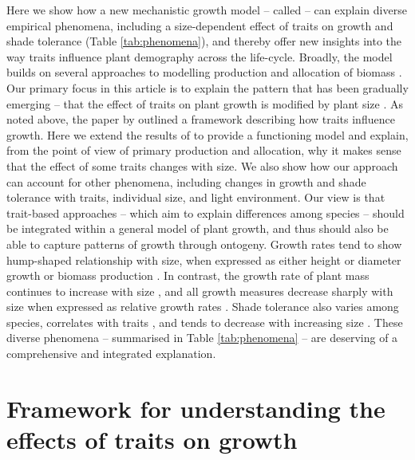 \documentclass[a4paper,11pt]{article}
\begin{document}
Here we show how a new mechanistic growth model -- called {\plant} \citep{Falster-2016} -- can explain diverse empirical phenomena, including a size-dependent effect of traits on growth and shade tolerance (Table \ref{tab:phenomena}), and thereby offer new insights into the way traits influence plant demography across the life-cycle. Broadly, the {\plant} model builds on several approaches to modelling production and allocation of biomass \citep[e.g.][]{Givnish-1988, Yokozawa-1995,Makela-1997, Moorcroft-2001, Sitch-2008, Falster-2011, King-2011}. Our primary focus in this article is to explain the pattern that has been gradually emerging -- that the effect of traits on plant growth is modified by plant size \citep{Ruger-2012, Iida-2014, Gibert-2016}. As noted above, the paper by \citet{Gibert-2016} outlined a framework describing how traits influence growth. Here we extend the results of \citet{Gibert-2016} to provide a functioning model and explain, from the point of view of primary production and allocation, why it makes sense that the effect of some traits changes with size. We also show how our approach can account for other phenomena, including changes in growth and shade tolerance with traits, individual size, and light environment. Our view is that trait-based approaches -- which aim to explain differences among species -- should be integrated within a general model of plant growth, and thus should also be able to capture patterns of growth through ontogeny. Growth rates tend to show hump-shaped relationship with size, when expressed as either height \citep{Sillett-2010, King-2011} or diameter growth \citep{Herault-2011} or biomass production \citep{Givnish-1988, Koch-2004}. In contrast, the growth rate of plant mass continues to increase with size \citep{Sillett-2010, Stephenson-2014}, and all growth measures decrease sharply with size when expressed as relative growth rates \citep{Rees-2010, Iida-2014}. Shade tolerance also varies among species, correlates with traits \citep{Lusk-2008,Poorter-2006}, and tends to decrease with increasing size \citep{Givnish-1988, Lusk-2008}. These diverse phenomena -- summarised in Table \ref{tab:phenomena} -- are deserving of a comprehensive and integrated explanation.

\section{Framework for understanding the effects of traits on growth}
\end{document}
